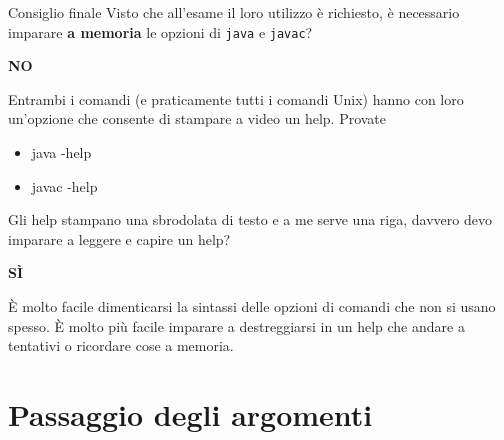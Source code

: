 \documentclass[presentation]{beamer}
\begin{document}
\begin{frame}{Consiglio finale}
  Visto che all'esame il loro utilizzo è richiesto, è necessario imparare \textbf{a memoria} le opzioni di \texttt{java} e \texttt{javac}?
  \begin{center}
    \textbf{NO}
  \end{center}
  Entrambi i comandi (e praticamente tutti i comandi Unix) hanno con loro un'opzione che consente di stampare a video un help. Provate
  \begin{block}{}
    \begin{itemize}
      \item java -help
      \item javac -help
    \end{itemize}
  \end{block}
  \vspace{10pt}
  
  Gli help stampano una sbrodolata di testo e a me serve una riga, davvero devo imparare a leggere e capire un help?
  \begin{center}
    \textbf{SÌ}
  \end{center}
  È molto facile dimenticarsi la sintassi delle opzioni di comandi che non si usano spesso. È molto più facile imparare a destreggiarsi in un help che andare a tentativi o ricordare cose a memoria.
\end{frame}

\section{Passaggio degli argomenti}
\end{document}
